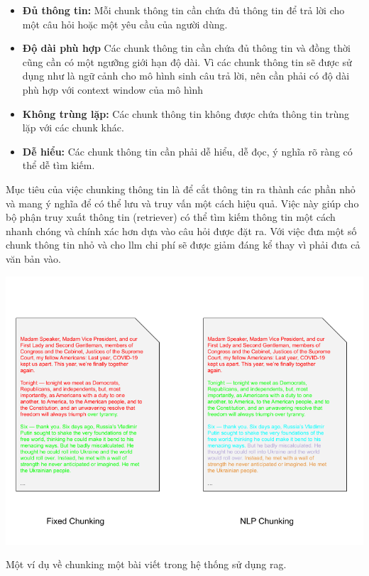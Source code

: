 \documentclass[a4paper, 12pt, openany]{book}
\begin{document}
\begin{itemize}
    \item \textbf{Đủ thông tin:} Mỗi chunk thông tin cần chứa đủ thông tin để trả lời cho một câu hỏi hoặc một yêu cầu của người dùng.
    \item \textbf{Độ dài phù hợp} Các chunk thông tin cần chứa đủ thông tin và đồng thời cũng cần có một ngưỡng giới hạn độ dài. Vì các chunk thông tin sẽ 
    được sử dụng như là ngữ cảnh cho mô hình sinh câu trả lời, nên cần phải có độ dài phù hợp với context window của mô hình
    \item \textbf{Không trùng lặp:} Các chunk thông tin không được chứa thông tin trùng lặp với các chunk khác.
    \item \textbf{Dễ hiểu:} Các chunk thông tin cần phải dễ hiểu, dễ đọc, ý nghĩa rõ ràng có thể dễ tìm kiếm.
\end{itemize}

Mục tiêu của việc chunking thông tin là để cắt thông tin ra thành các phần nhỏ và mang ý nghĩa để có thể lưu và truy vấn một cách hiệu quả.
Việc này giúp cho bộ phận truy xuất thông tin (retriever) có thể tìm kiếm thông tin một cách nhanh chóng và chính xác hơn dựa vào câu hỏi được đặt ra. Với việc đưa một số chunk thông tin nhỏ và cho \ac{llm}
chi phí sẽ được giảm đáng kể thay vì phải đưa cả văn bản vào.

\begin{minipage}{\linewidth}
    \centering
    \includegraphics[width=.8\linewidth]{./assets/images/chunking-blog-post.png}
    \captionsetup{type=figure}
    \caption{Một ví dụ về chunking một bài viết trong hệ thống sử dụng \ac{rag}.}
    \label{fig:rag-blog-post}
\end{minipage}

\vspace{0.5cm}
\end{document}
